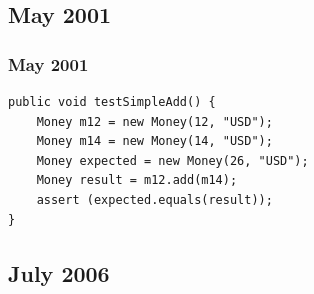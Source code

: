 \documentclass[14pt]{beamer}
\begin{document}
\subsection{May 2001}


\begin{frame}[fragile]
\frametitle{May 2001}
\begin{center}
\begin{lstlisting}[frame=single]
public void testSimpleAdd() {
    Money m12 = new Money(12, "USD");
    Money m14 = new Money(14, "USD");
    Money expected = new Money(26, "USD");
    Money result = m12.add(m14);
    assert (expected.equals(result));
}
\end{lstlisting} 
\end{center}
\end{frame}

\subsection{July 2006}
\end{document}
